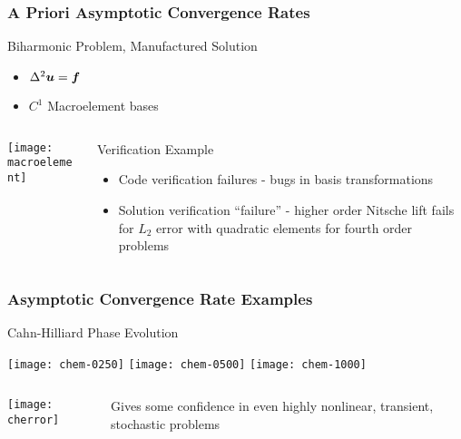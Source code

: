 \begin{frame}
\frametitle{A Priori Asymptotic Convergence Rates}
\begin{block}{Biharmonic Problem, Manufactured Solution}
\begin{itemize}
\item $\Delta^2 {\boldsymbol{u}} = {\boldsymbol{f}}$
\item $C^1$ Macroelement bases
\end{itemize}
\end{block}

\begin{columns}
\begin{column}{.5\textwidth}
\texttt{[image: macroelement]}
\end{column}
\begin{column}{.5\textwidth}
\begin{block}{Verification Example}
\begin{itemize}
\item Code verification failures - bugs in basis transformations
\item Solution verification ``failure'' - higher order Nitsche lift
fails for $L_2$ error with quadratic elements for fourth order problems
\end{itemize}
\end{block}
\end{column}
\end{columns}

\end{frame}

\begin{frame}
\frametitle{Asymptotic Convergence Rate Examples}
\begin{block}{Cahn-Hilliard Phase Evolution}
\begin{center}
\texttt{[image: chem-0250]}
\;\;\;
\texttt{[image: chem-0500]}
\;\;\;
\texttt{[image: chem-1000]}
\end{center}
\end{block}

\begin{columns}
\begin{column}{.4\textwidth}
\begin{center}
\texttt{[image: cherror]}
\end{center}
\end{column}
\begin{column}{.6\textwidth}
Gives some confidence in even highly nonlinear, transient, stochastic problems
\end{column}
\end{columns}

\end{frame}


